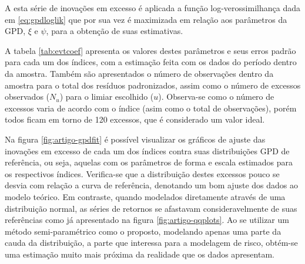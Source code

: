 \documentclass[1p]{elsarticle}
\theoremstyle{definition}
\begin{document}
A esta série de inovações em excesso é aplicada a função log-verossimilhança dada em \eqref{eq:gpdloglik} que por sua vez é maximizada em relação aos parâmetros da GPD, $\xi$ e $\psi$, para a obtenção de suas estimativas.

A tabela \ref{tab:evtcoef} apresenta os valores destes parâmetros e seus erros padrão para cada um dos índices, com a estimação feita com os dados do período dentro da amostra. Também são apresentados o número de observações dentro da amostra para o total dos resíduos padronizados, assim como o número de excessos observados ($N_u$) para o limiar escolhido ($u$). Observa-se como o número de excessos varia de acordo com o índice (asim como o total de observações), porém todos ficam em torno de 120 excessos, que é considerado um valor ideal. 

	

Na figura \ref{fig:artigo-gpdfit} é possível visualizar os gráficos de ajuste das inovações em excesso de cada um dos índices contra suas distribuições GPD de referência, ou seja, aquelas com os parâmetros de forma e escala estimados para os respectivos índices. Verifica-se que a distribuição destes excessos pouco se desvia com relação a curva de referência, denotando um bom ajuste dos dados ao modelo teórico. Em contraste, quando modelados diretamente através de uma distribuição normal, as séries de retornos se afastavam consideravelmente de suas referências como já apresentado na figura \ref{fig:artigo-qqplots}. Ao se utilizar um método semi-paramétrico como o proposto, modelando apenas uma parte da cauda da distribuição, a parte que interessa para a modelagem de risco, obtém-se uma estimação muito mais próxima da realidade que os dados apresentam.
\end{document}
